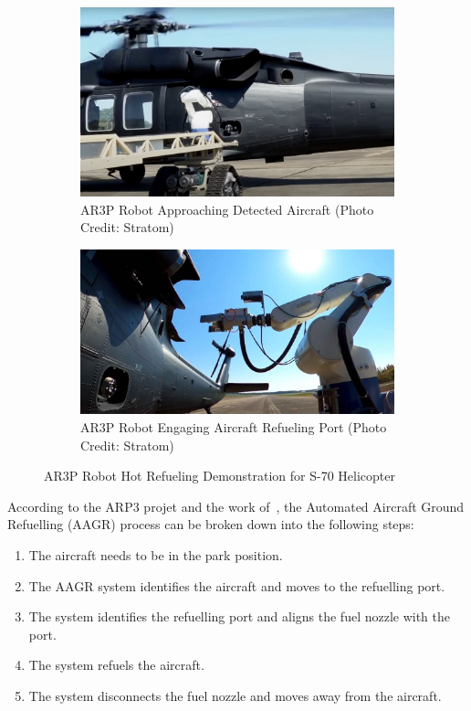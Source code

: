 \documentclass[12pt,oneside]{book} %
\begin{document}
\begin{figure}[H]
    \centering
    \begin{subfigure}[b]{0.45\textwidth}
        \includegraphics[width=\textwidth]{figures/test_2020_2.png}
        \caption{AR3P Robot Approaching Detected Aircraft (Photo Credit: Stratom)}\label{test-2020-2}
    \end{subfigure}
    \hfill
    \begin{subfigure}[b]{0.45\textwidth}
        \includegraphics[width=\textwidth]{figures/test_2020_3.jpg}
        \caption{AR3P Robot Engaging Aircraft Refueling Port (Photo Credit: Stratom)}\label{test-2020-3}
    \end{subfigure}
    \caption{AR3P Robot Hot Refueling Demonstration for S-70 Helicopter}\label{fig:automated-refuelling-systems}
\end{figure}

\newpage
According to the ARP3 projet and the work of~\citet{AGRPoseEstimation}, the
Automated Aircraft Ground Refuelling (AAGR) process can be broken down into the
following steps:
\begin{enumerate}
    \item The aircraft needs to be in the park position.
    \item The AAGR system identifies the aircraft and moves to the refuelling port.
    \item The system identifies the refuelling port and aligns the fuel nozzle with the
          port.
    \item The system refuels the aircraft.
    \item The system disconnects the fuel nozzle and moves away from the aircraft.
\end{enumerate}
\end{document}
